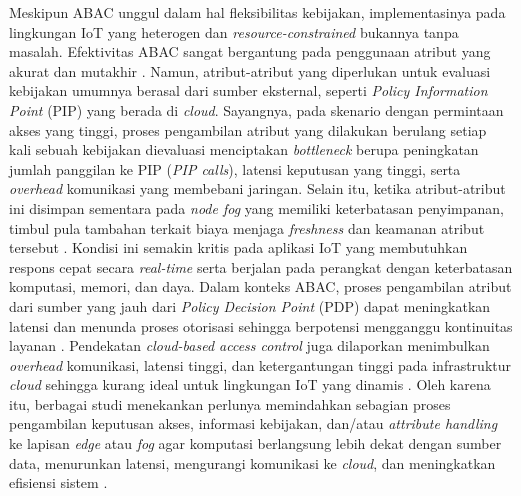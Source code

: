 Meskipun ABAC unggul dalam hal fleksibilitas kebijakan, implementasinya pada lingkungan IoT yang heterogen dan \textit{resource-constrained} bukannya tanpa masalah. Efektivitas ABAC sangat bergantung pada penggunaan atribut yang akurat dan mutakhir \parencite{taheri_bi-directional_2023}. Namun, atribut-atribut yang diperlukan untuk evaluasi kebijakan umumnya berasal dari sumber eksternal, seperti \textit{Policy Information Point} (PIP) yang berada di \textit{cloud}. Sayangnya, pada skenario dengan permintaan akses yang tinggi, proses pengambilan atribut yang dilakukan berulang setiap kali sebuah kebijakan dievaluasi menciptakan \textit{bottleneck} berupa peningkatan jumlah panggilan ke PIP (\textit{PIP calls}), latensi keputusan yang tinggi, serta \textit{overhead} komunikasi yang membebani jaringan. Selain itu, ketika atribut-atribut ini disimpan sementara pada \textit{node fog} yang memiliki keterbatasan penyimpanan, timbul pula tambahan terkait biaya menjaga \textit{freshness} dan keamanan atribut tersebut \parencite{cremonezi_improving_2022}. Kondisi ini semakin kritis pada aplikasi IoT yang membutuhkan respons cepat secara \textit{real-time} serta berjalan pada perangkat dengan keterbatasan komputasi, memori, dan daya. Dalam konteks ABAC, proses pengambilan atribut dari sumber yang jauh dari \textit{Policy Decision Point} (PDP) dapat meningkatkan latensi dan menunda proses otorisasi sehingga berpotensi mengganggu kontinuitas layanan \parencite{cremonezi_improving_2022}. Pendekatan \textit{cloud-based access control} juga dilaporkan menimbulkan \textit{overhead} komunikasi, latensi tinggi, dan ketergantungan tinggi pada infrastruktur \textit{cloud} sehingga kurang ideal untuk lingkungan IoT yang dinamis \parencite{kalaria_adaptive_2024}. Oleh karena itu, berbagai studi menekankan perlunya memindahkan sebagian proses pengambilan keputusan akses, informasi kebijakan, dan/atau \textit{attribute handling} ke lapisan \textit{edge} atau \textit{fog} agar komputasi berlangsung lebih dekat dengan sumber data, menurunkan latensi, mengurangi komunikasi ke \textit{cloud}, dan meningkatkan efisiensi sistem \parencite{frimpong_footsteps_2022,xue_edge_2025,laroui_edge_2021}.

